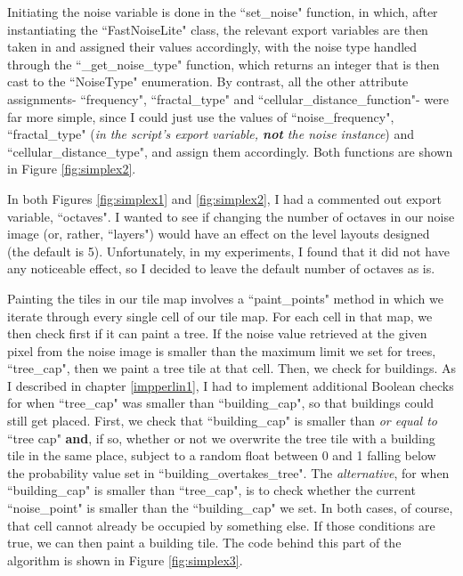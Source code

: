 Initiating the noise variable is done in the ``set\_noise" function, in which, after instantiating the ``FastNoiseLite" class, the relevant export variables are then taken in and assigned their values accordingly, with the noise type handled through the ``\_get\_noise\_type" function, which returns an integer that is then cast to the ``NoiseType" enumeration. By contrast, all the other attribute assignments- ``frequency", ``fractal\_type" and ``cellular\_distance\_function"- were far more simple, since I could just use the values of ``noise\_frequency", ``fractal\_type" (\textit{in the script's export variable, \textbf{not} the noise instance}) and ``cellular\_distance\_type", and assign them accordingly. Both functions are shown in Figure \ref{fig:simplex2}.

In both Figures \ref{fig:simplex1} and \ref{fig:simplex2}, I had a commented out export variable, ``octaves". I wanted to see if changing the number of octaves in our noise image (or, rather, ``layers") would have an effect on the level layouts designed (the default is 5\cite{fastnoiselitedocs}). Unfortunately, in my experiments, I found that it did not have any noticeable effect, so I decided to leave the default number of octaves as is. 

Painting the tiles in our tile map involves a ``paint\_points" method in which we iterate through every single cell of our tile map. For each cell in that map, we then check first if it can paint a tree. If the noise value retrieved at the given pixel from the noise image is smaller than the maximum limit we set for trees, ``tree\_cap", then we paint a tree tile at that cell. Then, we check for buildings. As I described in chapter \ref{impperlin1}, I had to implement additional Boolean checks for when ``tree\_cap" was smaller than ``building\_cap", so that buildings could still get placed. First, we check that ``building\_cap" is smaller than \textit{or equal to} ``tree cap" \textbf{and}, if so, whether or not we overwrite the tree tile with a building tile in the same place, subject to a random float between 0 and 1 falling below the probability value set in ``building\_overtakes\_tree". The \textit{alternative}, for when ``building\_cap" is smaller than ``tree\_cap", is to check whether the current ``noise\_point" is smaller than the ``building\_cap" we set. In both cases, of course, that cell cannot already be occupied by something else. If those conditions are true, we can then paint a building tile. The code behind this part of the algorithm is shown in Figure \ref{fig:simplex3}.

